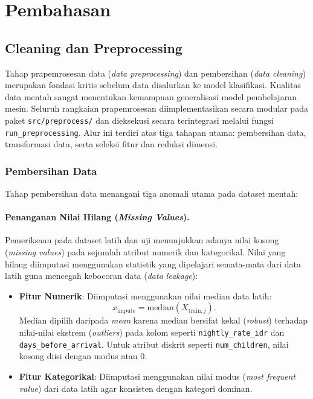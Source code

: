 \section{Pembahasan}

\subsection{Cleaning dan Preprocessing}
\label{subsec:preprocessing}

Tahap prapemrosesan data (\textit{data preprocessing}) dan pembersihan (\textit{data cleaning})
merupakan fondasi kritis sebelum data disalurkan ke model klasifikasi. Kualitas data mentah
sangat menentukan kemampuan generalisasi model pembelajaran mesin. Seluruh rangkaian prapemrosesan
diimplementasikan secara modular pada paket \texttt{src/preprocess/} dan dieksekusi secara
terintegrasi melalui fungsi \texttt{run\_preprocessing}. Alur ini terdiri atas tiga tahapan utama:
pembersihan data, transformasi data, serta seleksi fitur dan reduksi dimensi.

\subsubsection{Pembersihan Data}

Tahap pembersihan data menangani tiga anomali utama pada dataset mentah:

\paragraph{Penanganan Nilai Hilang (\textit{Missing Values}).}
Pemeriksaan pada dataset latih dan uji menunjukkan adanya nilai kosong (\textit{missing values})
pada sejumlah atribut numerik dan kategorikal. Nilai yang hilang diimputasi menggunakan statistik
yang dipelajari semata-mata dari data latih guna mencegah kebocoran data (\textit{data leakage}):
\begin{itemize}
  \item \textbf{Fitur Numerik}: Diimputasi menggunakan nilai median data latih:
        \[
        x_{\text{impute}} = \text{median}(X_{\text{train}, j}) .
        \]
        Median dipilih daripada \textit{mean} karena median bersifat kekal (\textit{robust}) terhadap nilai-nilai
        ekstrem (\textit{outliers}) pada kolom seperti \texttt{nightly\_rate\_idr} dan \texttt{days\_before\_arrival}.
        Untuk atribut diskrit seperti \texttt{num\_children}, nilai kosong diisi dengan modus atau 0.
  \item \textbf{Fitur Kategorikal}: Diimputasi menggunakan nilai modus (\textit{most frequent value})
        dari data latih agar konsisten dengan kategori dominan.
\end{itemize}

